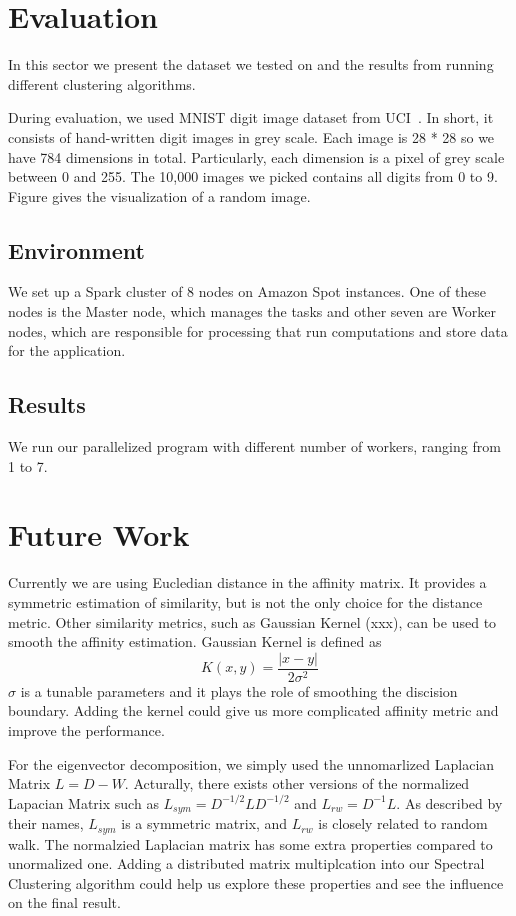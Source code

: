 \documentclass{acm_proc_article-sp}
\begin{document}
\section{Evaluation}
In this sector we present the dataset we tested on and the results from running different clustering algorithms.

During evaluation, we used MNIST digit image dataset from UCI~\cite{Lichman:2013}. In short, it consists of hand-written digit images in grey scale. Each image is 28 * 28 so we have 784 dimensions in total. Particularly, each dimension is a pixel of grey scale between 0 and 255. The 10,000 images we picked contains all digits from 0 to 9. Figure gives the visualization of a random image.

\subsection{Environment}
We set up a Spark cluster of 8 nodes on Amazon Spot instances. One of these nodes is the Master node, which manages the tasks and other seven are Worker nodes, which are responsible for processing that run computations and store data for the application.

\subsection{Results}
We run our parallelized program with different number of workers, ranging from 1 to 7.

\section{Future Work}
Currently we are using Eucledian distance in the affinity matrix. It provides a symmetric estimation of similarity, but is not the only choice for the distance metric. Other similarity metrics, such as Gaussian Kernel (xxx), can be used to smooth the affinity estimation. Gaussian Kernel is defined as $$K(x, y) = \frac{|x - y|}{2\sigma^2}$$ $\sigma$ is a tunable parameters and it plays the role of smoothing the discision boundary. Adding the kernel could give us more complicated affinity metric and improve the performance.

For the eigenvector decomposition, we simply used the unnomarlized Laplacian Matrix $L = D - W$. Acturally, there exists other versions of the normalized Lapacian Matrix such as $L_{sym} = D^{-1/2}LD^{-1/2}$ and $L_{rw} = D^{-1}L$. As described by their names, $L_{sym}$ is a symmetric matrix, and $L_{rw}$ is closely related to random walk. The normalzied Laplacian matrix has some extra properties compared to unormalized one. Adding a distributed matrix multiplcation into our Spectral Clustering algorithm could help us explore these properties and see the influence on the final result.
\end{document}
